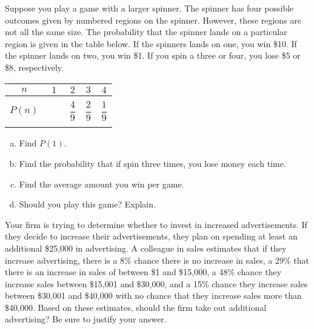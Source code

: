 \documentclass[11pt,letterpaper]{article}
\begin{document}

 Suppose you play a game with a larger spinner. The spinner has four possible outcomes given by numbered regions on the spinner. However, these regions are not all the same size. The probability that the spinner lands on a particular region is given in the table below. If the spinners lands on one, you win \$10. If the spinner lands on two, you win \$1. If you spin a three or four, you lose \$5 or \$8, respectively. 
	\begin{table}[!ht]
	\centering 
	\begin{tabular}{|c||c|c|c|c|} \hline 
	$n$ & $1$ & $2$ & $3$ & $4$ \\ \hline 
	$P(n)$ & $\phantom{\dfrac{4\rule{0pt}{2.9ex}}{12\rule[-1.3ex]{0pt}{0pt}}}$ & $\dfrac{4}{9}$ & $\dfrac{2}{9}$ & $\dfrac{1}{9}$ \\ \hline
	\end{tabular}
	\end{table}

\begin{enumerate}[(a)]
\item Find $P(1)$.
\item Find the probability that if spin three times, you lose money each time. 
\item Find the average amount you win per game.
\item Should you play this game? Explain. 
\end{enumerate}



\newpage



 Your firm is trying to determine whether to invest in increased advertisements. If they decide to increase their advertisements, they plan on spending at least an additional \$25,000 in advertising. A colleague in sales estimates that if they increase advertising, there is a 8\% chance there is no increase in sales, a 29\% that there is an increase in sales of between \$1 and \$15,000, a 48\% chance they increase sales between \$15,001 and \$30,000, and a 15\% chance they increase sales between \$30,001 and \$40,000 with no chance that they increase sales more than \$40,000. Based on these estimates, should the firm take out additional advertising? Be sure to justify your answer. 
\end{document}
